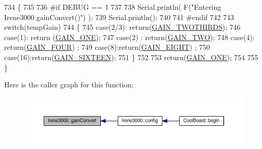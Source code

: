 \begin{DoxyCode}
734 \{
735 
736 \textcolor{preprocessor}{#if DEBUG == 1 }
737 
738     Serial.println( F(\textcolor{stringliteral}{"Entering Irene3000.gainConvert()"}) );
739     Serial.println();
740 
741 \textcolor{preprocessor}{#endif }
742     
743     \textcolor{keywordflow}{switch}(tempGain)
744     \{
745         \textcolor{keywordflow}{case}(2/3): \textcolor{keywordflow}{return}(\hyperlink{_cool_adafruit___a_d_s1015_8h_a3d6c0e15829a207b9155890811fa4781a879d688347ec0bf159fe1278db602f68}{GAIN\_TWOTHIRDS});
746         \textcolor{keywordflow}{case}(1): \textcolor{keywordflow}{return} (\hyperlink{_cool_adafruit___a_d_s1015_8h_a3d6c0e15829a207b9155890811fa4781ab6b0b520637e016e297110bebeb23a54}{GAIN\_ONE});
747         \textcolor{keywordflow}{case}(2) : \textcolor{keywordflow}{return}(\hyperlink{_cool_adafruit___a_d_s1015_8h_a3d6c0e15829a207b9155890811fa4781a447f66a13d0dfbe92462e35f1307cc0d}{GAIN\_TWO});
748         \textcolor{keywordflow}{case}(4): \textcolor{keywordflow}{return}(\hyperlink{_cool_adafruit___a_d_s1015_8h_a3d6c0e15829a207b9155890811fa4781a33fa5521f4e806b7438052fcdbbf8660}{GAIN\_FOUR}) ;   
749         \textcolor{keywordflow}{case}(8):\textcolor{keywordflow}{return}(\hyperlink{_cool_adafruit___a_d_s1015_8h_a3d6c0e15829a207b9155890811fa4781af284da818fc21db27c5ffcfaff7047cb}{GAIN\_EIGHT})  ;  
750         \textcolor{keywordflow}{case}(16):\textcolor{keywordflow}{return}(\hyperlink{_cool_adafruit___a_d_s1015_8h_a3d6c0e15829a207b9155890811fa4781a08fc581748aedabe657bb8aa9464d734}{GAIN\_SIXTEEN});  
751     \}
752 
753     \textcolor{keywordflow}{return}(\hyperlink{_cool_adafruit___a_d_s1015_8h_a3d6c0e15829a207b9155890811fa4781ab6b0b520637e016e297110bebeb23a54}{GAIN\_ONE});
754 
755 \}
\end{DoxyCode}
Here is the caller graph for this function\+:\nopagebreak
\begin{figure}[H]
\begin{center}
\leavevmode
\includegraphics[width=350pt]{d6/d03/class_irene3000_abcad62d1201a59f8dd3ba87048002728_icgraph}
\end{center}
\end{figure}
\mbox{\label{class_irene3000_a7bc2414100b5e19eacc6630fa34b2654}} 
